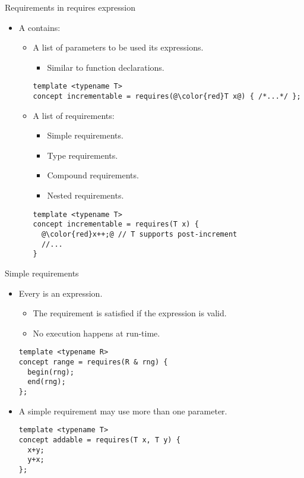 \begin{frame}[t,fragile]{Requirements in requires expression}
\begin{itemize}
  \item A  contains:
    \pause
    \begin{itemize}
      \item A list of parameters to be used its expressions.
        \begin{itemize}
          \item Similar to function declarations.
        \end{itemize}
\begin{lstlisting}[escapechar=@]
template <typename T> 
concept incrementable = requires(@\color{red}T x@) { /*...*/ };
\end{lstlisting}

      \pause
      \item A list of requirements:
        \begin{itemize}
          \item Simple requirements.
          \item Type requirements.
          \item Compound requirements.
          \item Nested requirements.
        \end{itemize}
\begin{lstlisting}[escapechar=@]
template <typename T> 
concept incrementable = requires(T x) { 
  @\color{red}x++;@ // T supports post-increment
  //...
}
\end{lstlisting}
    \end{itemize}

\end{itemize}
\end{frame}

\begin{frame}[t,fragile]{Simple requirements}
\begin{itemize}
  \item Every  is an expression.
    \begin{itemize}
      \item The requirement is satisfied if the expression is valid.
      \item No execution happens at run-time.
    \end{itemize}

\begin{lstlisting}
template <typename R>
concept range = requires(R & rng) {
  begin(rng);
  end(rng);
};
\end{lstlisting}

  \item A simple requirement may use more than one parameter.
\begin{lstlisting}
template <typename T>
concept addable = requires(T x, T y) {
  x+y;
  y+x;
};
\end{lstlisting}

\end{itemize}
\end{frame}

